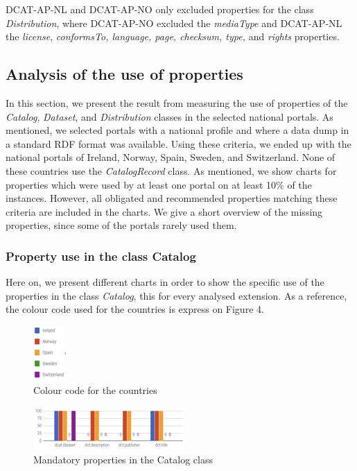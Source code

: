 \documentclass[<options>]{elsarticle}
\begin{document}
DCAT-AP-NL and DCAT-AP-NO only excluded properties for the class \textit{Distribution}, where DCAT-AP-NO excluded the \textit{mediaType} and DCAT-AP-NL the \textit{license}, \textit{conformsTo, language, page, checksum, type, } and \textit{rights} properties.

\subsection{Analysis of the use of properties}
In this section, we present the result from measuring the use of properties of the \textit{Catalog}, \textit{Dataset}, and \textit{Distribution} classes in the selected national portals. As mentioned, we selected portals with a national profile and where a data dump in a standard RDF format was available. Using these criteria, we ended up with the national portals of Ireland, Norway, Spain, Sweden, and Switzerland. None of these countries use the \textit{CatalogRecord} class. As mentioned, we show charts for properties which were used by at least one portal on at least 10\% of the instances. However, all obligated and recommended properties matching these criteria are included in the charts. We give a short overview of the missing properties, since some of the portals rarely used them.

\subsubsection{Property use in the class Catalog}
Here on, we present different charts in order to show the specific use of the properties in the class \textit{Catalog}, this for every analysed extension.
As a reference, the colour code used for the countries is express on Figure 4.

\begin{figure}[H]
\includegraphics{replace3.png}
\caption{Colour code for the countries}
\end{figure}

\begin{figure}[H]
\includegraphics{replace4.png}
\caption{Mandatory properties in the Catalog class}
\end{figure}
\end{document}
